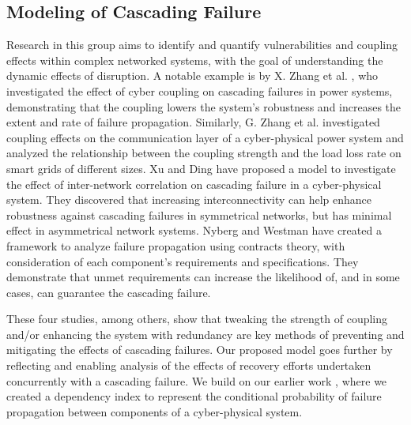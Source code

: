 \documentclass[runningheads]{llncs}
\begin{document}
\subsection{Modeling of Cascading Failure }
Research in this group aims to identify and quantify vulnerabilities and coupling effects within complex networked systems, with the goal of understanding the dynamic effects of disruption. A notable example is by 
X. Zhang et al. \cite{zhang_effects_2017}, who investigated the effect of cyber coupling on cascading failures in power systems, demonstrating that the coupling lowers the system's robustness and increases the extent and rate of failure propagation. 
Similarly, G. Zhang et al. \cite{zhang_cascading_2021} investigated coupling effects on the communication layer of a cyber-physical power system and analyzed the relationship between the coupling strength and the load loss rate on smart grids of different sizes. Xu and Ding \cite{xu_cascading_2024} have proposed a model to investigate the effect of inter-network correlation on cascading failure in a cyber-physical system. They discovered that increasing interconnectivity can help enhance robustness against cascading failures in symmetrical networks, but has minimal effect in asymmetrical network systems.
Nyberg and Westman \cite{nyberg_failure_2015} have created a framework to analyze failure propagation using contracts theory, with consideration of each component's requirements and specifications. They demonstrate that unmet requirements can increase the likelihood of, and in some cases, can guarantee the cascading failure. %



These four studies, among others, show that tweaking the 
strength of coupling and/or enhancing the system with redundancy are key methods of preventing and mitigating the effects of cascading failures. Our proposed model goes further by reflecting and enabling analysis of the effects of recovery efforts undertaken concurrently with a cascading failure. We build on our earlier work \cite{marashi_identification_2021}, where we created a dependency index to represent the conditional probability of failure propagation between components of a cyber-physical system. 
\end{document}
